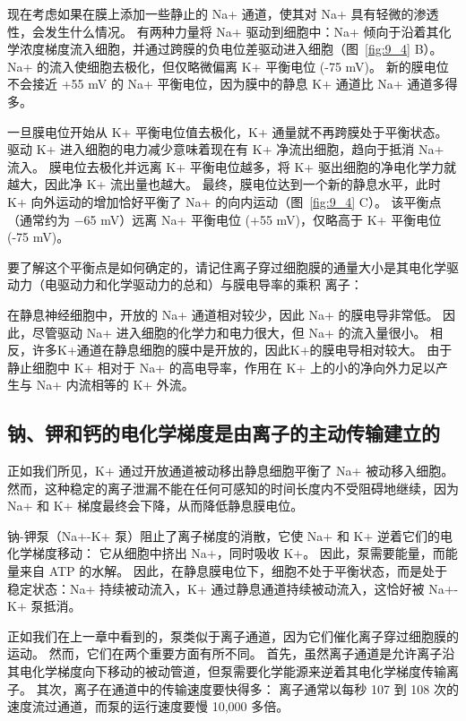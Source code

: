 现在考虑如果在膜上添加一些静止的 Na+ 通道，使其对 Na+ 具有轻微的渗透性，会发生什么情况。
有两种力量将 Na+ 驱动到细胞中：Na+ 倾向于沿着其化学浓度梯度流入细胞，并通过跨膜的负电位差驱动进入细胞（图~\ref{fig:9_4} B）。
Na+ 的流入使细胞去极化，但仅略微偏离 K+ 平衡电位 (-75 mV)。
新的膜电位不会接近 +55 mV 的 Na+ 平衡电位，因为膜中的静息 K+ 通道比 Na+ 通道多得多。


一旦膜电位开始从 K+ 平衡电位值去极化，K+ 通量就不再跨膜处于平衡状态。
驱动 K+ 进入细胞的电力减少意味着现在有 K+ 净流出细胞，趋向于抵消 Na+ 流入。
膜电位去极化并远离 K+ 平衡电位越多，将 K+ 驱出细胞的净电化学力就越大，因此净 K+ 流出量也越大。
最终，膜电位达到一个新的静息水平，此时 K+ 向外运动的增加恰好平衡了 Na+ 的向内运动（图~\ref{fig:9_4} C）。
该平衡点（通常约为 −65 mV）远离 Na+ 平衡电位 (+55 mV)，仅略高于 K+ 平衡电位 (-75 mV)。


要了解这个平衡点是如何确定的，请记住离子穿过细胞膜的通量大小是其电化学驱动力（电驱动力和化学驱动力的总和）与膜电导率的乘积 离子：


在静息神经细胞中，开放的 Na+ 通道相对较少，因此 Na+ 的膜电导非常低。
因此，尽管驱动 Na+ 进入细胞的化学力和电力很大，但 Na+ 的流入量很小。
相反，许多K+通道在静息细胞的膜中是开放的，因此K+的膜电导相对较大。
由于静止细胞中 K+ 相对于 Na+ 的高电导率，作用在 K+ 上的小的净向外力足以产生与 Na+ 内流相等的 K+ 外流。



\subsection{钠、钾和钙的电化学梯度是由离子的主动传输建立的}

正如我们所见，K+ 通过开放通道被动移出静息细胞平衡了 Na+ 被动移入细胞。
然而，这种稳定的离子泄漏不能在任何可感知的时间长度内不受阻碍地继续，因为 Na+ 和 K+ 梯度最终会下降，从而降低静息膜电位。


钠-钾泵（Na+-K+ 泵）阻止了离子梯度的消散，它使 Na+ 和 K+ 逆着它们的电化学梯度移动：
它从细胞中挤出 Na+，同时吸收 K+。
因此，泵需要能量，而能量来自 ATP 的水解。
因此，在静息膜电位下，细胞不处于平衡状态，而是处于稳定状态：Na+ 持续被动流入，K+ 通过静息通道持续被动流入，这恰好被 Na+-K+ 泵抵消。


正如我们在上一章中看到的，泵类似于离子通道，因为它们催化离子穿过细胞膜的运动。
然而，它们在两个重要方面有所不同。
首先，虽然离子通道是允许离子沿其电化学梯度向下移动的被动管道，但泵需要化学能源来逆着其电化学梯度传输离子。
其次，离子在通道中的传输速度要快得多：
离子通常以每秒 107 到 108 次的速度流过通道，而泵的运行速度要慢 10,000 多倍。


